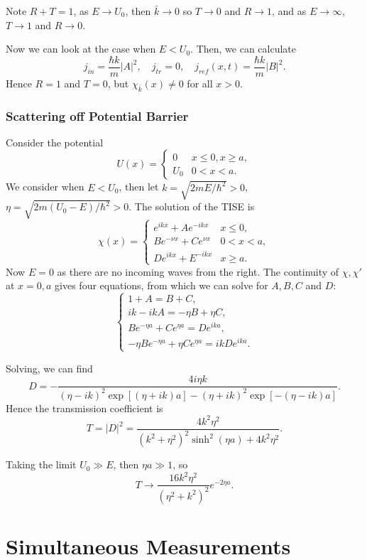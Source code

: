 \documentclass[12pt]{article}
\begin{document}
Note $R + T = 1$, as $E \to U_0$, then $\bar k \to 0$ so $T \to 0$ and $R \to 1$, and as $E \to \infty$, $T \to 1$ and $R \to 0$.

Now we can look at the case when $E < U_0$. Then, we can calculate
\[
	j_{in} = \frac{\hbar k}{m}|A|^2, \quad j_{tr} = 0, \quad j_{ref}(x, t) = \frac{\hbar k}{m}|B|^2
.\]
Hence $R = 1$ and $T = 0$, but $\chi_{\bar k}(x) \neq 0$ for all $x > 0$.

\subsubsection{Scattering off Potential Barrier}%
\label{subsub:scattering_off_potential_barrier}

Consider the potential
\[
	U(x) =
	\begin{cases}
		0 & x \leq 0, x \geq a, \\
		U_0 & 0 < x < a.
	\end{cases}
\]
We consider when $E < U_0$, then let $k = \sqrt{2mE/\hbar^2} > 0$, $\eta = \sqrt{2m(U_0 - E)/\hbar^2} > 0$. The solution of the TISE is
\[
	\chi(x) =
	\begin{cases}
		e^{ikx} + Ae^{-ikx} & x \leq 0, \\
		B e^{-\nu x} + C e^{\nu x} & 0 < x < a, \\
		De^{ikx} + E^{-ikx} & x \geq a.
	\end{cases}
\]
Now $E = 0$ as there are no incoming waves from the right. The continuity of $\chi, \chi'$ at $x = 0, a$ gives four equations, from which we can solve for $A, B, C$ and $D$:
\[
\begin{cases}
	1 + A = B + C, \\
	ik - ikA = - \eta B + \eta C, \\
	Be^{-\eta a} + Ce^{\eta a} = De^{ika}, \\
	-\eta Be^{-\eta a} + \eta Ce^{\eta a} = ikDe^{ika}.
\end{cases}
\]

Solving, we can find
\[
	D = - \frac{4 i \eta k}{(\eta - ik)^2 \exp[(\eta + ik)a] - (\eta + ik)^2\exp[-(\eta - ik)a]}
.\]
Hence the transmission coefficient is
\[
	T = |D|^2 = \frac{4 k^2 \eta^2}{(k^2 + \eta^2)^2 \sinh^2(\eta a) + 4 k^2 \eta^2}
.\]

Taking the limit $U_0 \gg E$, then $\eta a \gg 1$, so
 \[
	 T \to \frac{16k^2 \eta^2}{(\eta^2 + k^2)^2} e^{-2 \eta a}
.\]

\newpage

\section{Simultaneous Measurements}%
\label{sec:simultaneous_measurements}
\end{document}
